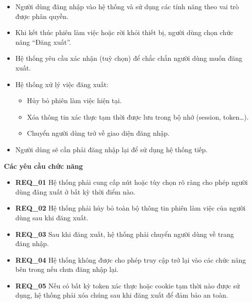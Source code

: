 \begin{itemize}

  \item Người dùng đăng nhập vào hệ thống và sử dụng các tính năng theo vai trò được phân quyền.

  \item Khi kết thúc phiên làm việc hoặc rời khỏi thiết bị, người dùng chọn chức năng “Đăng xuất”.

  \item Hệ thống yêu cầu xác nhận (tuỳ chọn) để chắc chắn người dùng muốn đăng xuất.

  \item Hệ thống xử lý việc đăng xuất:

    \begin{itemize}
      \item Hủy bỏ phiên làm việc hiện tại.
      \item Xóa thông tin xác thực tạm thời được lưu trong bộ nhớ (session, token…).
      \item Chuyển người dùng trở về giao diện đăng nhập.
    \end{itemize}

  \item Người dùng sẽ cần phải đăng nhập lại để sử dụng hệ thống tiếp.

\end{itemize}

\noindent \textbf{Các yêu cầu chức năng}

\begin{itemize}

  \item \textbf{REQ\_01} Hệ thống phải cung cấp nút hoặc tùy chọn rõ ràng cho phép người dùng đăng xuất ở bất kỳ thời điểm nào.

  \item \textbf{REQ\_02} Hệ thống phải hủy bỏ toàn bộ thông tin phiên làm việc của người dùng sau khi đăng xuất.

  \item \textbf{REQ\_03} Sau khi đăng xuất, hệ thống phải chuyển người dùng về trang đăng nhập.

  \item \textbf{REQ\_04} Hệ thống không được cho phép truy cập trở lại vào các chức năng bên trong nếu chưa đăng nhập lại.

  \item \textbf{REQ\_05} Nếu có bất kỳ token xác thực hoặc cookie tạm thời nào được sử dụng, hệ thống phải xóa chúng sau khi đăng xuất để đảm bảo an toàn.

\end{itemize}

